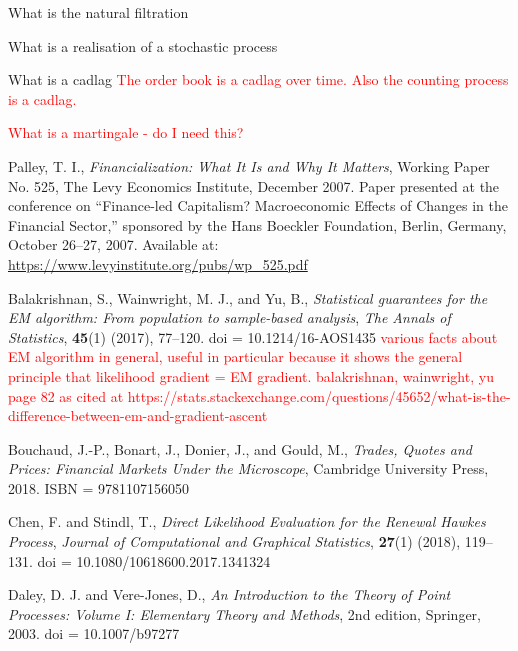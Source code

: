 \documentclass[honours,12pt]{unswthesis}
\numberwithin{equation}{section}
\begin{document}
What is the natural filtration

What is a realisation of a stochastic process

What is a cadlag \textcolor{red}{The order book is a cadlag over time. Also the counting process is a cadlag.}

\textcolor{red}{What is a martingale - do I need this?}





\clearpage
{}


\begin{thebibliography}{999}

Palley, T. I.,
\textit{Financialization: What It Is and Why It Matters},
Working Paper No. 525, The Levy Economics Institute, December 2007.
Paper presented at the conference on “Finance-led Capitalism? Macroeconomic Effects of Changes in the Financial Sector,” sponsored by the Hans Boeckler Foundation, Berlin, Germany, October 26–27, 2007.
Available at: \url{https://www.levyinstitute.org/pubs/wp\_525.pdf}

Balakrishnan, S., Wainwright, M. J., and Yu, B.,
\textit{Statistical guarantees for the EM algorithm: From population to sample-based analysis},
\textit{The Annals of Statistics},
\textbf{45}(1) (2017), 77--120.
doi = {10.1214/16-AOS1435}
\textcolor{red}{various facts about EM algorithm in general, useful in particular because it shows the general principle that likelihood gradient = EM gradient. balakrishnan, wainwright, yu page 82 as cited at https://stats.stackexchange.com/questions/45652/what-is-the-difference-between-em-and-gradient-ascent}

Bouchaud, J.-P., Bonart, J., Donier, J., and Gould, M.,
\textit{Trades, Quotes and Prices: Financial Markets Under the Microscope},
Cambridge University Press, 2018.
ISBN = {9781107156050}

Chen, F. and Stindl, T.,
\textit{Direct Likelihood Evaluation for the Renewal Hawkes Process},
\textit{Journal of Computational and Graphical Statistics},
\textbf{27}(1) (2018), 119--131.
doi = {10.1080/10618600.2017.1341324}

Daley, D. J. and Vere-Jones, D.,
\textit{An Introduction to the Theory of Point Processes: Volume I: Elementary Theory and Methods}, 2nd edition,
Springer, 2003.
doi = {10.1007/b97277}


\end{thebibliography}
\end{document}

